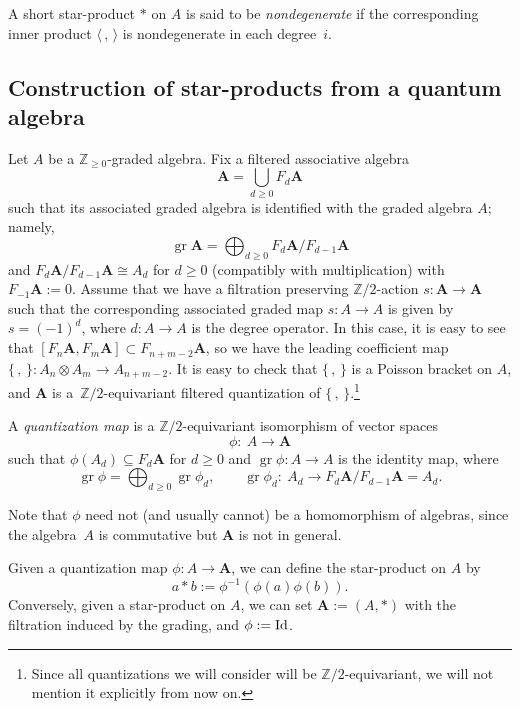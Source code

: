 \begin{Definition} A short star-product $*$ on $A$ is said to be {\it nondegenerate} if the corresponding inner product $\langle \,,\,\rangle$ is nondegenerate in each degree~$i$.
\end{Definition}

\subsection{Construction of star-products from a quantum algebra}\label{constru} Let $A$ be a ${\mathbb Z}_{\ge 0}$-graded algebra. Fix a filtered associative algebra
\[
{{\mathbf A}} = \bigcup_{d \geq 0} F_d{{\mathbf A}}
\]
such that its associated graded algebra is identified with the graded algebra $A$; namely,
\[
\operatorname{gr}{{\mathbf A}} = \bigoplus_{d \geq 0} F_{d}{{\mathbf A}}/F_{d-1}{{\mathbf A}}
\]
and $F_{d}{{\mathbf A}}/F_{d-1}{{\mathbf A}} \cong A_d$ for $d \geq 0$ (compatibly with multiplication) with $F_{-1}{{\mathbf A}} := 0$.
Assume that we have a filtration preserving ${\mathbb Z}/2$-action $s\colon {{\mathbf A}}\to {{\mathbf A}}$ such that the corresponding associated graded map $s\colon A\to A$ is given by $s=(-1)^d$, where $d\colon A\to A$ is the degree operator. In this case, it is easy to see that $[F_n{{\mathbf A}},F_m{{\mathbf A}}]\subset F_{n+m-2}{{\mathbf A}}$, so we have the leading coefficient map $\lbrace\,,\,\rbrace\colon A_n\otimes A_m\to A_{n+m-2}$. It is easy to check that $\lbrace\,,\,\rbrace$ is a Poisson bracket on $A$, and ${{\mathbf A}}$ is a~${\mathbb Z}/2$-equivariant filtered quantization of $\lbrace\,,\,\rbrace$.\footnote{Since all quantizations we will consider will be ${\mathbb Z}/2$-equivariant, we will not mention it explicitly from now on.}

\begin{Definition}A \emph{quantization map} is a ${\mathbb Z}/2$-equivariant isomorphism of vector spaces
\[
\phi \colon \ A \to {{\mathbf A}}
\]
such that $\phi(A_d) \subseteq F_d{{\mathbf A}}$ for $d\ge 0$ and $\operatorname{gr} \phi \colon A \to A$ is the identity map, where
\[
\operatorname{gr} \phi = \bigoplus_{d\geq 0} \operatorname{gr} \phi_d, \qquad \operatorname{gr} \phi_d \colon \ A_d \to F_d{{\mathbf A}}/F_{d-1}{{\mathbf A}}=A_d.
\]
\end{Definition}
Note that $\phi$ need not (and usually cannot) be a homomorphism of algebras, since the algebra~$A$ is commutative but ${{\mathbf A}}$ is not in general.

Given a quantization map $\phi\colon A \to {{\mathbf A}}$, we can define the star-product on $A$ by
\[
a * b := \phi^{-1}(\phi(a)\phi(b)).
\]
Conversely, given a star-product on $A$, we can set ${{\mathbf A}}:=(A,*)$ with the filtration induced by the grading, and $\phi:={\rm Id}$.

